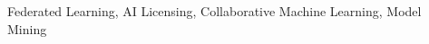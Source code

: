 \documentclass[journal]{IEEEtran}
\begin{document}
\begin{IEEEkeywords}
Federated Learning, AI Licensing, Collaborative Machine Learning, Model Mining
\end{IEEEkeywords}














\begin{comment}
{\appendix[Proof of the Zonklar Equations]
Use $\backslash${\tt{appendix}} if you have a single appendix:
Do not use $\backslash${\tt{section}} anymore after $\backslash${\tt{appendix}}, only $\backslash${\tt{section*}}.
If you have multiple appendixes use $\backslash${\tt{appendices}} then use $\backslash${\tt{section}} to start each appendix.
You must declare a $\backslash${\tt{section}} before using any $\backslash${\tt{subsection}} or using $\backslash${\tt{label}} ($\backslash${\tt{appendices}} by itself
starts a section numbered zero.)}


\end{comment}



\end{document}
